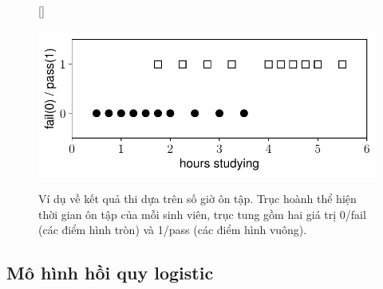 \begin{figure}[t]
    [\FBwidth]
    {\caption{ 
    Ví dụ về kết quả thi dựa trên số giờ ôn tập. Trục hoành thể hiện thời gian ôn tập của mỗi sinh viên, trục tung gồm hai giá trị 0/fail (các điểm hình tròn) và 1/pass (các điểm hình vuông).  
    }
    \label{fig:10_1}}
    { %
    \includegraphics[width=.5\textwidth]{ebookML_src/src/logistic_regression/ex1.pdf}
    }
\end{figure}

 
\subsection{Mô hình hồi quy logistic}
 
 
